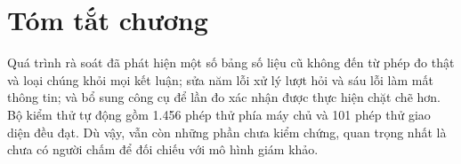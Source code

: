 \section{Tóm tắt chương}

Quá trình rà soát đã phát hiện một số bảng số liệu cũ không đến từ phép đo thật và loại chúng khỏi mọi kết luận; sửa năm lỗi xử lý lượt hỏi và sáu lỗi làm mất thông tin; và bổ sung công cụ để lần đo xác nhận được thực hiện chặt chẽ hơn. Bộ kiểm thử tự động gồm 1.456 phép thử phía máy chủ và 101 phép thử giao diện đều đạt. Dù vậy, vẫn còn những phần chưa kiểm chứng, quan trọng nhất là chưa có người chấm để đối chiếu với mô hình giám khảo.
